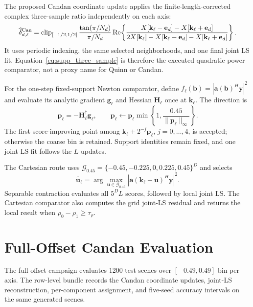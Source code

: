 \documentclass[11pt,onecolumn]{IEEEtran}
\begin{document}
The proposed Candan coordinate update applies the finite-length-corrected
complex three-sample ratio independently on each axis:
\begin{equation}
 \widehat{\delta}^{\rm Can}_{d,\ell}
 =\operatorname{clip}_{[-1/2,1/2]}
 \frac{\tan(\pi/N_d)}{\pi/N_d}
 \operatorname{Re}\!\left\{
 \frac{X[\mathbf{k}_\ell-\mathbf e_d]-X[\mathbf{k}_\ell+\mathbf e_d]}
 {2X[\mathbf{k}_\ell]-X[\mathbf{k}_\ell-\mathbf e_d]-X[\mathbf{k}_\ell+\mathbf e_d]}
 \right\}.
 \label{eq:supp_candan}
\end{equation}
It uses periodic indexing, the same selected neighborhoods, and one final
joint LS fit. Equation~\eqref{eq:supp_three_sample} is therefore the executed
quadratic power comparator, not a proxy name for Quinn or Candan.

For the one-step fixed-support Newton comparator, define
$f_\ell(\mathbf{b})=|\mathbf{a}(\mathbf{b})^H\mathbf{y}|^2$ and evaluate its
analytic gradient $\mathbf{g}_\ell$ and Hessian $\mathbf{H}_\ell$ once at
$\mathbf{k}_\ell$. The direction is
\begin{equation}
 \mathbf{p}_\ell=-\mathbf{H}_\ell^\dagger\mathbf{g}_\ell,\qquad
 \mathbf{p}_\ell\leftarrow
 \mathbf{p}_\ell\min\!\left\{1,\frac{0.45}{\|\mathbf{p}_\ell\|_\infty}\right\}.
 \label{eq:supp_newton}
\end{equation}
The first score-improving point among
$\mathbf{k}_\ell+2^{-j}\mathbf{p}_\ell$, $j=0,\ldots,4$, is accepted;
otherwise the coarse bin is retained. Support identities remain fixed, and
one joint LS fit follows the $L$ updates.

The Cartesian route uses
$\mathcal{G}_{0.45}=\{-0.45,-0.225,0,0.225,0.45\}^D$ and selects
\begin{equation}
 \widehat{\mathbf{u}}_\ell
 =\arg\max_{\mathbf{u}\in\mathcal{G}_{0.45}}
 |\mathbf{a}(\mathbf{k}_\ell+\mathbf{u})^H\mathbf{y}|^2.
\end{equation}
Separable contraction evaluates all $5^D L$ scores, followed by local joint
LS. The Cartesian comparator also computes the grid joint-LS residual and
returns the local result when $\rho_0-\rho_1\geq\tau_\rho$.

\section{Full-Offset Candan Evaluation}



The full-offset campaign evaluates 1200 test scenes over
$[-0.49,0.49]$ bin per axis. The row-level bundle records the Candan coordinate
updates, joint-LS reconstruction, per-component assignment, and five-seed
accuracy intervals on the same generated scenes.
\end{document}
